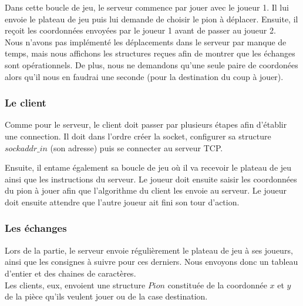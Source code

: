 \documentclass{article}
\begin{document}
        Dans cette boucle de jeu, le serveur commence par jouer avec le joueur 1. Il lui envoie le plateau de jeu puis lui demande de
        choisir le pion à déplacer. Ensuite, il reçoit les coordonnées envoyées par le joueur 1 avant de passer au joueur 2.\\
        Nous n'avons pas implémenté les déplacements dans le serveur par manque de temps, mais nous affichons les structures
        reçues afin de montrer que les échanges sont opérationnels. De plus, nous ne demandons qu'une seule paire de coordonées
        alors qu'il nous en faudrai une seconde (pour la destination du coup à jouer).


    \subsubsection{Le client}
        Comme pour le serveur, le client doit passer par plusieurs étapes afin d'établir une connection. Il doit dans l'ordre créer 
        la socket, configurer sa structure $sockaddr\_in$ (son adresse) puis se connecter au serveur TCP.

        \begin{changemargin}{-2cm}{-2cm}
            
        \end{changemargin}

        Ensuite, il entame également sa boucle de jeu où il va recevoir le plateau de jeu ainsi que les instructions du serveur.
        Le joueur doit ensuite saisir les coordonnées du pion à jouer afin que l'algorithme du client les envoie au serveur. Le joueur
        doit ensuite attendre que l'autre joueur ait fini son tour d'action.

        \begin{changemargin}{-2cm}{-2cm}
            
        \end{changemargin}

    \subsubsection{Les échanges}
        Lors de la partie, le serveur envoie régulièrement le plateau de jeu à ses joueurs, ainsi que les consignes à suivre pour
        ces derniers. Nous envoyons donc un tableau d'entier et des chaines de caractères.\\
        Les clients, eux, envoient une structure $Pion$ constituée de la coordonnée $x$ et $y$ de la pièce qu'ils veulent jouer 
        ou de la case destination.
\end{document}
